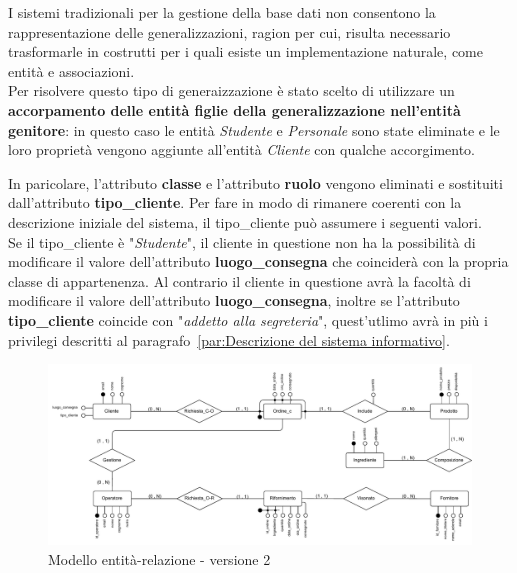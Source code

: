 \documentclass[12pt,a4paper]{article}
\begin{document}
    \vspace{8pt}
    \noindent
    I sistemi tradizionali per la gestione della base dati non consentono la rappresentazione delle generalizzazioni, ragion per cui, risulta necessario trasformarle in costrutti per i quali esiste un implementazione naturale, come entità e associazioni.\\
    Per risolvere questo tipo di generaizzazione è stato scelto di utilizzare un \textbf{accorpamento delle entità figlie della generalizzazione nell'entità genitore}: in questo caso le entità \textit{Studente} e \textit{Personale} sono state eliminate e le loro proprietà vengono aggiunte all'entità \textit{Cliente} con qualche accorgimento.
    
    \vspace{8pt}
    \noindent
    In paricolare, l'attributo \textbf{classe} e l'attributo \textbf{ruolo} vengono eliminati e sostituiti dall'attributo \textbf{tipo\_cliente}. Per fare in modo di rimanere coerenti con la descrizione iniziale del sistema, il tipo\_cliente può assumere i seguenti valori.\\
    Se il tipo\_cliente è "\textit{Studente}", il cliente in questione non ha la possibilità di modificare il valore dell'attributo \textbf{luogo\_consegna} che coinciderà con la propria classe di appartenenza.
    Al contrario il cliente in questione avrà la facoltà di modificare il valore dell'attributo \textbf{luogo\_consegna}, inoltre se l'attributo \textbf{tipo\_cliente} coincide con "\textit{addetto alla segreteria}", quest'utlimo avrà in più i privilegi descritti al paragrafo~\ref{par:Descrizione del sistema informativo}.\\
    \begin{figure}[H]
        \centering
        \vspace{-20pt}  %
        \includegraphics[width=\textwidth]{figures/Conceptual_model_2.pdf}
        \vspace{-20pt}  %
        \caption{Modello entità-relazione - versione 2}
        \label{fig:Conceptual_model2}
    \end{figure} 
    
\end{document}
